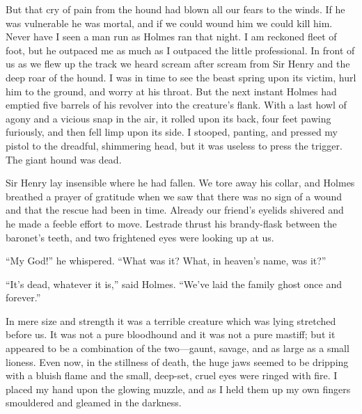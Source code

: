 \documentclass[paper=5.5in:8.5in,BCOR=7mm,twoside,DIV=calc,12pt,usegeometry,openany,chapterprefix,endperiod]{scrbook} %
\begin{document}
But that cry of pain from the hound had blown all our fears to the winds. If he was vulnerable he was mortal, and if we could wound him we could kill him. Never have I seen a man run as Holmes ran that night. I am reckoned fleet of foot, but he outpaced me as much as I outpaced the little professional. In front of us as we flew up the track we heard scream after scream from Sir Henry and the deep roar of the hound. I was in time to see the beast spring upon its victim, hurl him to the ground, and worry at his throat. But the next instant Holmes had emptied five barrels of his revolver into the creature's flank. With a last howl of agony and a vicious snap in the air, it rolled upon its back, four feet pawing furiously, and then fell limp upon its side. I stooped, panting, and pressed my pistol to the dreadful, shimmering head, but it was useless to press the trigger. The giant hound was dead.



Sir Henry lay insensible where he had fallen. We tore away his collar, and Holmes breathed a prayer of gratitude when we saw that there was no sign of a wound and that the rescue had been in time. Already our friend's eyelids shivered and he made a feeble effort to move. Lestrade thrust his brandy-flask between the baronet's teeth, and two frightened eyes were looking up at us.

\enquote{My God!} he whispered. \enquote{What was it? What, in heaven's name, was it?}

\enquote{It's dead, whatever it is,} said Holmes. \enquote{We've laid the family ghost once and forever.}

In mere size and strength it was a terrible creature which was lying stretched before us. It was not a pure bloodhound and it was not a pure mastiff; but it appeared to be a combination of the two\nobreakdash---gaunt, savage, and as large as a small lioness. Even now, in the stillness of death, the huge jaws seemed to be dripping with a bluish flame and the small, deep-set, cruel eyes were ringed with fire. I placed my hand upon the glowing muzzle, and as I held them up my own fingers smouldered and gleamed in the darkness.

\end{document}
